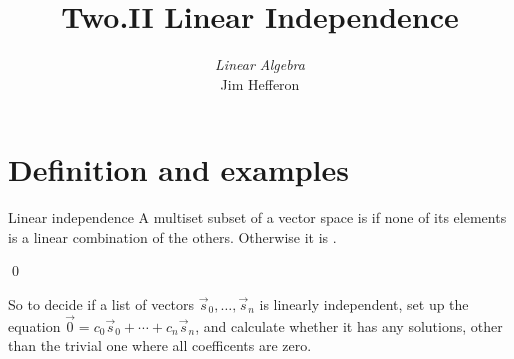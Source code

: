 \documentclass[10pt,t]{beamer}
\title[Linear Independence] %
{Two.II Linear Independence}
\author{\textit{Linear Algebra} \\ {\small Jim Hef{}feron}}
\institute{
  \texttt{http://joshua.smcvt.edu/linearalgebra}
}
\date{}
\begin{document}
\begin{frame}
  \titlepage
\end{frame}




\section{Definition and examples}
\begin{frame}{Linear independence}
A multiset subset of a vector space is 
if none of its elements is a linear combination of the others.
Otherwise it is .

\pause\medskip
{}
\end{frame}



\begin{frame}
\lm[le:LDIffANonTrivLinRel]

\pause
\pf
{}
\qed

\bigskip
So to decide if a list of vectors 
$\vec{s}_0, \ldots,\vec{s}_n$
is linearly independent,
set up the equation
$\vec{0}=c_0\vec{s}_0+\cdots+c_n\vec{s}_n$,
and calculate whether it has any solutions, other than
the trivial one where all coefficents are zero.
\end{frame}
\end{document}
